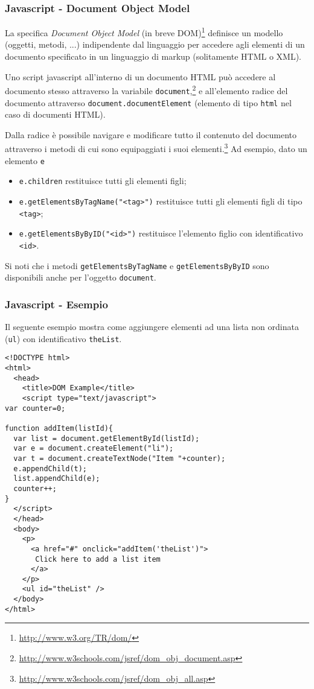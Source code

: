 \documentclass[8pt]{beamer}
\begin{document}
\begin{frame}
 \frametitle{Javascript - Document Object Model}

 La specifica \emph{Document Object Model} (in breve DOM)\footnote{\url{http://www.w3.org/TR/dom/}}
 definisce un modello (oggetti, metodi, ...) indipendente dal linguaggio
 per accedere agli elementi di un documento specificato in un linguaggio di
 markup (solitamente HTML o XML).
 \vspace{\baselineskip}
 
 Uno script javascript all'interno di un documento HTML pu\`o
 accedere al documento stesso attraverso la variabile \texttt{document},\footnote{\url{http://www.w3schools.com/jsref/dom_obj_document.asp}}
 e all'elemento radice del documento attraverso \texttt{document.documentElement} (elemento
 di tipo \texttt{html} nel caso di documenti HTML).
 \vspace{\baselineskip}
 
 Dalla radice \`e possibile navigare e modificare tutto 
 il contenuto del documento attraverso i metodi di cui sono
 equipaggiati i suoi elementi.\footnote{\url{http://www.w3schools.com/jsref/dom_obj_all.asp}}
 Ad esempio, dato un elemento \texttt{e}
 \begin{itemize}
  \item \texttt{e.children} restituisce tutti gli elementi figli;
  \item \texttt{e.getElementsByTagName("<tag>")} restituisce tutti gli elementi figli di 
  tipo \texttt{<tag>};
  \item \texttt{e.getElementsByByID("<id>")} restituisce l'elemento figlio con identificativo
  \texttt{<id>}.  
 \end{itemize}

 Si noti che i metodi \texttt{getElementsByTagName} e \texttt{getElementsByByID} 
 sono disponibili anche per l'oggetto \texttt{document}.
\end{frame}

\begin{frame}[fragile]
 \frametitle{Javascript - Esempio}
 Il seguente esempio mostra come aggiungere elementi ad
 una lista non ordinata (\texttt{ul}) con identificativo
 \texttt{theList}.
 
\begin{small}
\begin{verbatim}
<!DOCTYPE html>
<html>
  <head>
    <title>DOM Example</title>
    <script type="text/javascript">
var counter=0;

function addItem(listId){
  var list = document.getElementById(listId);
  var e = document.createElement("li");
  var t = document.createTextNode("Item "+counter);
  e.appendChild(t);
  list.appendChild(e);
  counter++;
}
  </script>
  </head>
  <body>
    <p>
      <a href="#" onclick="addItem('theList')">
       Click here to add a list item
      </a>
    </p>
    <ul id="theList" />
  </body>
</html> 
 \end{verbatim} 
\end{small}
\end{frame}
\end{document}
